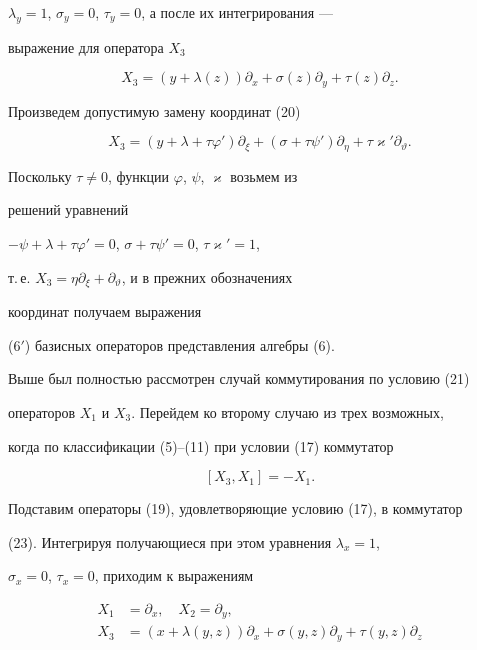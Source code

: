 $\lambda_y=1$, $\sigma_y=0$, $\tau_y=0$, а после их интегрирования --- 


выражение для оператора $X_3$


$$ 


X_3=(y+\lambda(z))\partial_x+\sigma(z)\partial_y+ 


\tau(z)\partial_z. 


$$ 


 


Произведем допустимую замену координат (20)


$$ 


X_3=(y+\lambda+\tau\varphi')\partial_\xi+ 


(\sigma+\tau\psi')\partial_\eta+\tau\varkappa'\partial_\vartheta. 


$$ 


Поскольку $\tau\ne 0$, функции $\varphi$, $\psi$, $\varkappa$ возьмем из 


решений уравнений 


$-\psi+\lambda+\tau\varphi'=0$, $\sigma+\tau\psi'=0$, $\tau\varkappa'=1$, 


т.\,е. $X_3=\eta\partial_\xi+\partial_\vartheta$, и в прежних обозначениях 


координат получаем выражения 


(6${}'$) базисных операторов представления алгебры (6). 


 


Выше был полностью рассмотрен случай коммутирования по условию (21) 


операторов $X_1$ и $X_3$. Перейдем ко второму случаю из трех возможных, 


когда по классификации (5)--(11) при условии (17) коммутатор 


\begin{equation} 


[X_3,X_1]=-X_1. 


\end{equation} 


Подставим операторы (19), удовлетворяющие условию (17), в коммутатор 


(23). Интегрируя получающиеся при этом уравнения $\lambda_x=1$, 


$\sigma_x=0$, $\tau_x=0$, приходим к выражениям 


\begin{equation} 


\begin{split} 


X_1&=\partial_x,\quad X_2=\partial_y,\\ 


X_3&=(x+\lambda(y,z))\partial_x+ 


\sigma(y,z)\partial_y+\tau(y,z)\partial_z 


\end{split} 


\end{equation} 


